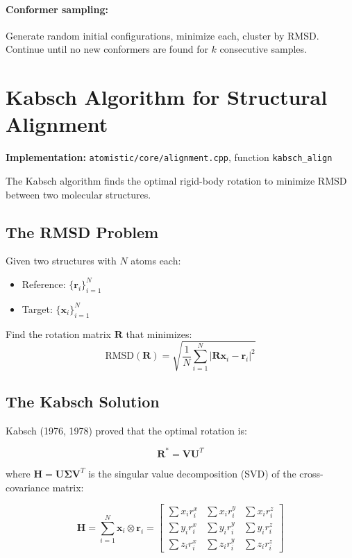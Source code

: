 \documentclass[11pt]{article}
\begin{document}
\paragraph{Conformer sampling:} Generate random initial configurations, minimize each, cluster by RMSD. Continue until no new conformers are found for $k$ consecutive samples.

\section{Kabsch Algorithm for Structural Alignment}

\textbf{Implementation:} \texttt{atomistic/core/alignment.cpp}, function \texttt{kabsch\_align}

The Kabsch algorithm finds the optimal rigid-body rotation to minimize RMSD between two molecular structures.

\subsection{The RMSD Problem}

Given two structures with $N$ atoms each:
\begin{itemize}
\item Reference: $\{\mathbf{r}_i\}_{i=1}^{N}$
\item Target: $\{\mathbf{x}_i\}_{i=1}^{N}$
\end{itemize}

Find the rotation matrix $\mathbf{R}$ that minimizes:
\begin{equation}
\text{RMSD}(\mathbf{R}) = \sqrt{\frac{1}{N}\sum_{i=1}^{N} |\mathbf{R}\mathbf{x}_i - \mathbf{r}_i|^2}
\end{equation}

\subsection{The Kabsch Solution}

Kabsch (1976, 1978) proved that the optimal rotation is:

\begin{equation}
\mathbf{R}^* = \mathbf{V}\mathbf{U}^T
\end{equation}

where $\mathbf{H} = \mathbf{U}\boldsymbol{\Sigma}\mathbf{V}^T$ is the singular value decomposition (SVD) of the cross-covariance matrix:

\begin{equation}
\mathbf{H} = \sum_{i=1}^{N} \mathbf{x}_i \otimes \mathbf{r}_i = \begin{bmatrix} 
\sum x_i r_i^x & \sum x_i r_i^y & \sum x_i r_i^z \\
\sum y_i r_i^x & \sum y_i r_i^y & \sum y_i r_i^z \\
\sum z_i r_i^x & \sum z_i r_i^y & \sum z_i r_i^z
\end{bmatrix}
\end{equation}
\end{document}
